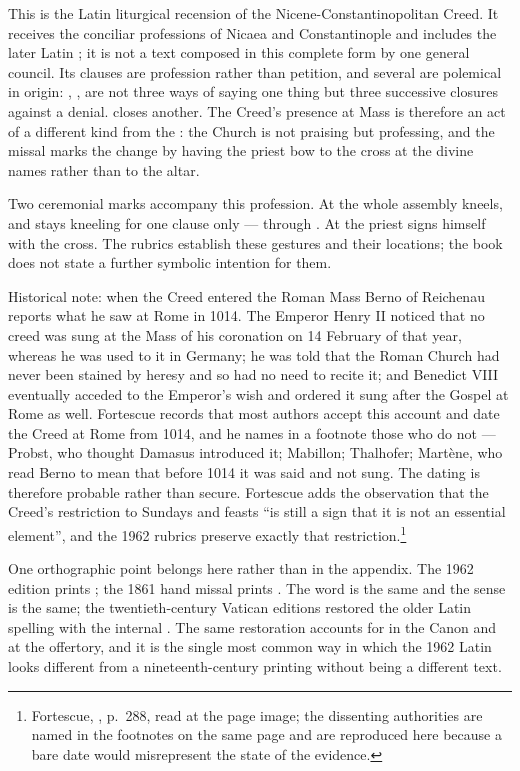 This is the Latin liturgical recension of the Nicene-Constantinopolitan Creed.
It receives the conciliar professions of Nicaea and Constantinople and includes
the later Latin ; it is not a text composed in this complete
form by one general council. Its clauses are profession rather than petition,
and several are polemical in origin:
, ,
 are not three ways of saying one thing but
three successive closures against a denial.  closes another. The Creed's presence at Mass is therefore an act of a
different kind from the : the Church is not praising but
professing, and the missal marks the change by having the priest bow to the
cross at the divine names rather than to the altar.

Two ceremonial marks accompany this profession. At
 the whole assembly kneels, and stays kneeling for
one clause only --- through . At
 the priest signs himself with the cross.
The rubrics establish these gestures and their locations; the book does not
state a further symbolic intention for them.

\begin{witnesscard}{Historical note: when the Creed entered the Roman Mass}
Berno of Reichenau reports what he saw at Rome in 1014. The Emperor Henry II
noticed that no creed was sung at the Mass of his coronation on 14 February of
that year, whereas he was used to it in Germany; he was told that the Roman
Church had never been stained by heresy and so had no need to recite it; and
Benedict VIII eventually acceded to the Emperor's wish and ordered it sung
after the Gospel at Rome as well. Fortescue records that most authors accept
this account and date the Creed at Rome from 1014, and he names in a footnote
those who do not --- Probst, who thought Damasus introduced it; Mabillon;
Thalhofer; Mart\`ene, who read Berno to mean that before 1014 it was said and
not sung. The dating is therefore probable rather than secure. Fortescue adds
the observation that the Creed's restriction to Sundays and feasts ``is still a
sign that it is not an essential element'', and the 1962 rubrics preserve
exactly that restriction.\footnote{Fortescue, , p.~288, read at
the page image; the dissenting authorities are named in the footnotes on the
same page and are reproduced here because a bare date would misrepresent the
state of the evidence.}
\end{witnesscard}

One orthographic point belongs here rather than in the appendix. The 1962
edition prints ; the 1861 hand
missal prints . The word is the same and the sense is the
same; the twentieth-century Vatican editions restored the older Latin spelling
with the internal . The same restoration accounts for
 in the Canon and  at the offertory,
and it is the single most common way in which the 1962 Latin looks different
from a nineteenth-century printing without being a different text.
